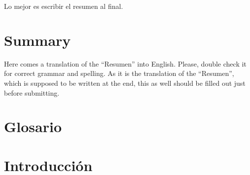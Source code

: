 \documentclass[a4paper, 12pt]{report}
\begin{document}
Lo mejor es escribir el resumen al final.


\chapter*{Summary}

Here comes a translation of the ``Resumen'' into English. Please, double check it for correct grammar and spelling.
As it is the translation of the ``Resumen'', which is supposed to be written at the end, this as well should be filled out
just before submitting.
\printglossaries
\glsaddall
\chapter*{Glosario}
\newpage




\tableofcontents 
\listoffigures %



\cleardoublepage
\chapter{Introducción}
\label{sec:intro} %
\end{document}
